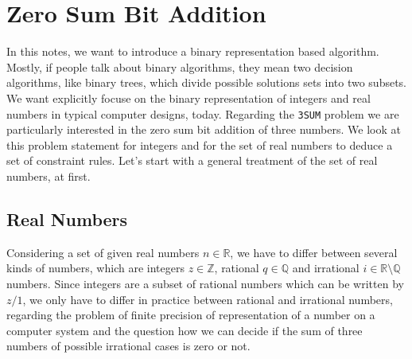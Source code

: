 \section{Zero Sum Bit Addition}
\label{s:zerosumbitaddition}
In this notes, we want to introduce a binary representation based algorithm. Mostly, if people talk about binary algorithms, they mean two decision algorithms, like binary trees, which divide possible solutions sets into two subsets. We want explicitly focuse on the binary representation of integers and real numbers in typical computer designs, today. Regarding the \texttt{3SUM} problem we are particularly interested in the zero sum bit addition of three numbers. We look at this problem statement for integers and for the set of real numbers to deduce a set of constraint rules. Let's start with a general treatment of the set of real numbers, at first.
\subsection{Real Numbers}
\label{ss:realnumbers}
Considering a set of given real numbers $n \in \mathbb{R}$, we have to differ between several kinds of numbers, which are integers $z \in \mathbb{Z}$, rational $q \in \mathbb{Q}$ and irrational $i \in \mathbb{R} \setminus \mathbb{Q}$ numbers. Since integers are a subset of rational numbers which can be written by $z/1$, we only have to differ in practice between rational and irrational numbers, regarding the problem of finite precision of representation of a number on a computer system and the question how we can decide if the sum of three numbers of possible irrational cases is zero or not. 

